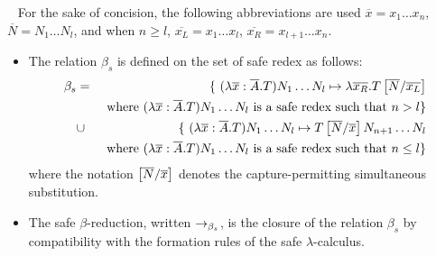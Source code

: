 \begin{dfn} \
\label{dfn:safereduction} For the sake of concision, the following
abbreviations are used $\overline{x} = x_1 \ldots x_n$,
$\overline{N} = N_1 \ldots N_l$, and when $n\geq l$, $\overline{x_L}
= x_1 \ldots x_l$, $\overline{x_R} = x_{l+1} \ldots x_n$.
\begin{itemize}
\item The relation $\beta_s$ is defined on the set of safe redex as follows:
\begin{eqnarray*}
\beta_s &=&
\{  \ (\lambda \overline{x} : \overline{A} . T) N_1 \ldots N_l \mapsto \lambda \overline{x_R}. T\left[ \overline{N}/\overline{x_L} \right]  \\
&& \mbox{ where $(\lambda \overline{x} : \overline{A} . T) N_1 \ldots N_l$ is a safe redex such that $n> l$}
\} \\
&\cup&
\{ \ (\lambda \overline{x} : \overline{A} . T) N_1 \ldots N_l \mapsto T\left[ \overline{N}/\overline{x} \right] N_{n+1} \ldots N_l  \\
&& \mbox{ where $(\lambda \overline{x} : \overline{A} . T) N_1 \ldots N_l$ is a safe redex such that $n\leq l$}
\}
\end{eqnarray*}
where the notation $\left[ \overline{N}/\overline{x} \right]$ denotes the capture-permitting simultaneous substitution.

\item
The safe $\beta$-reduction, written $\rightarrow_{\beta_s}$, is the closure of
the relation $\beta_s$ by compatibility with the formation rules of
the safe $\lambda$-calculus.
\end{itemize}
\end{dfn}



